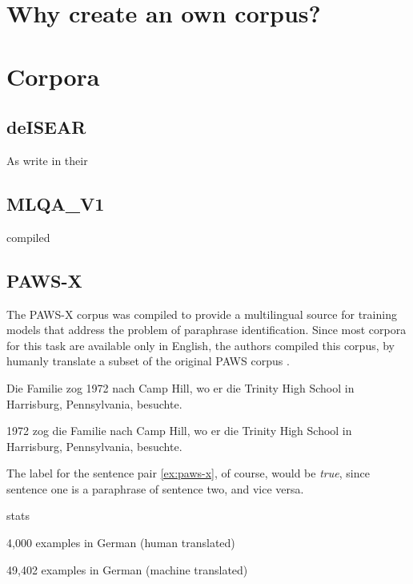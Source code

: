 
\label{chap:5_dataset}

\section{Why create an own corpus?}

\section{Corpora}

\subsection{deISEAR}

As \cite{troiano2019crowdsourcing} write in their 

\subsection{MLQA\_V1}

\cite{lewis2019mlqa} compiled

\subsection{PAWS-X}

The PAWS-X corpus \cite{yang2019paws} was compiled to provide a multilingual source for training models that address the problem of paraphrase identification. 
Since most corpora for this task are available only in English, the authors compiled this corpus, by humanly translate a subset of the original PAWS corpus \cite{zhang2019paws}.

\begin{examples}
	\label{ex:paws-x}
	\item Die Familie zog 1972 nach Camp Hill, wo er die Trinity High School in Harrisburg, Pennsylvania, besuchte.
		
	1972 zog die Familie nach Camp Hill, wo er die Trinity High School in Harrisburg, Pennsylvania, besuchte.
\end{examples}

The label for the sentence pair \ref{ex:paws-x}, of course, would be \textit{true}, since sentence one is a paraphrase of sentence two, and vice versa.


stats

4,000 examples in German (human translated)

49,402 examples in German (machine translated)




